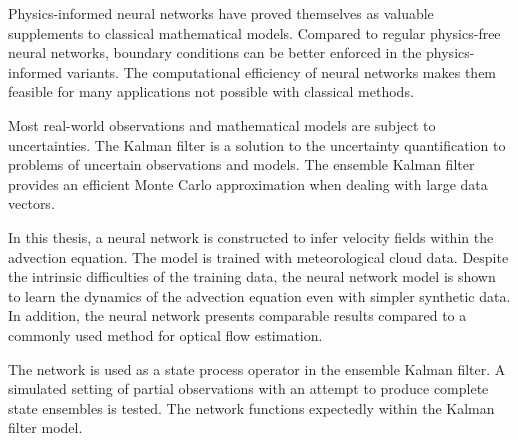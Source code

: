 \documentclass[UKenglish, 12pt, a4paper, sci, utf8, a-1b, online]{aaltothesis}
\date{14.2.2024}
\numberwithin{equation}{section}
\numberwithin{figure}{section}
\numberwithin{theorem}{section}
\numberwithin{definition}{section}
\numberwithin{lemma}{section}
\begin{document}
\makecoverpage

\makecopyrightpage


\begin{abstractpage}[english]
    Physics-informed neural networks have proved themselves as valuable supplements to classical mathematical models.
    Compared to regular physics-free neural networks, boundary conditions can be better enforced in the physics-informed variants.
    The computational efficiency of neural networks makes them feasible for many applications not possible with classical methods.

    Most real-world observations and mathematical models are subject to uncertainties.
    The Kalman filter is a solution to the uncertainty quantification to problems of uncertain observations and models.
    The ensemble Kalman filter provides an efficient Monte Carlo approximation when dealing with large data vectors.

    In this thesis, a neural network is constructed to infer velocity fields within the advection equation.
    The model is trained with meteorological cloud data.
    Despite the intrinsic difficulties of the training data, the neural network model is shown to learn the dynamics of the advection equation even with simpler synthetic data.
    In addition, the neural network presents comparable results compared to a commonly used method for optical flow estimation.

    The network is used as a state process operator in the ensemble Kalman filter.
    A simulated setting of partial observations with an attempt to produce complete state ensembles is tested.
    The network functions expectedly within the Kalman filter model. 
\end{abstractpage}

\end{document}
